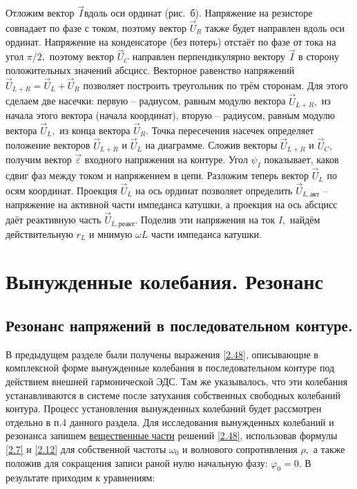 Отложим вектор $\vec I$вдоль оси ординат (рис.~б). Напряжение на резисторе совпадает по фазе с током, поэтому вектор $\vec U_R$ также будет направлен вдоль оси ординат. Напряжение на конденсаторе (без потерь) отстаёт по фазе от тока на угол $\pi/2,$ поэтому вектор $\vec U_C$ направлен перпендикулярно вектору $\vec I$ в сторону положительных значений абсцисс. Векторное равенство напряжений $\vec U_{L+R}=\vec U_L+\vec U_R$ позволяет построить треугольник по трём сторонам. Для этого сделаем две насечки: первую – радиусом, равным модулю вектора $\vec U_{L+R},$ из начала этого вектора (начала координат), вторую – радиусом, равным модулю вектора $\vec U_L,$ из конца вектора $\vec U_R.$ Точка пересечения насечек определяет положение векторов $\vec U_{L+R}$ и $\vec U_L$ на диаграмме. Сложив векторы $\vec U_{L+R}$ и $\vec U_C,$ получим вектор $\vec\varepsilon$ входного напряжения на контуре. Угол $\psi_I$ показывает, каков сдвиг фаз между током и напряжением в цепи. Разложим теперь вектор $\vec U_L$ по осям координат. Проекция $\vec U_L$ на ось ординат позволяет определить $\vec U_{L,\text{акт}}$ – напряжение на активной части импеданса катушки, а проекция на ось абсцисс даёт реактивную часть $\vec U_{L,\text{реакт}}.$ Поделив эти напряжения на ток $I,$ найдём действительную $r_L$ и мнимую $\omega L$ части импеданса катушки.

\section{Вынужденные колебания. Резонанс}
\subsection{Резонанс напряжений в последовательном контуре.} 
В предыдущем разделе были получены выражения \eqref{2.48}, описывающие в комплексной форме вынужденные колебания в последовательном контуре под действием внешней гармонической ЭДС. Там же указывалось, что эти колебания устанавливаются в системе после затухания собственных свободных колебаний контура. Процесс установления вынужденных колебаний будет рассмотрен отдельно в п.4 данного раздела. Для исследования вынужденных колебаний и резонанса запишем \underline{вещественные части} решений \eqref{2.48}, использовав формулы \eqref{2.7} и \eqref{2.12} для собственной частоты $\omega_0$ и волнового сопротивления $\rho,$ а также положив для сокращения записи раной нулю начальную фазу: $\varphi_0=0$. В результате приходим к уравнениям:


